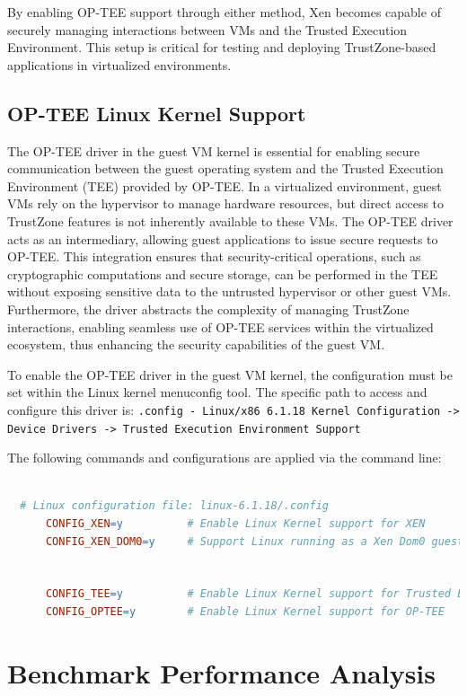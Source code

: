 \documentclass[acmtog]{acmart}
\begin{document}
By enabling OP-TEE support through either method, Xen becomes capable of securely managing interactions between VMs and the Trusted Execution Environment. This setup is critical for testing and deploying TrustZone-based applications in virtualized environments.


\subsection{OP-TEE Linux Kernel Support}
The OP-TEE driver in the guest VM kernel is essential for enabling secure communication between the guest operating system and the Trusted Execution Environment (TEE) provided by OP-TEE. In a virtualized environment, guest VMs rely on the hypervisor to manage hardware resources, but direct access to TrustZone features is not inherently available to these VMs. The OP-TEE driver acts as an intermediary, allowing guest applications to issue secure requests to OP-TEE. This integration ensures that security-critical operations, such as cryptographic computations and secure storage, can be performed in the TEE without exposing sensitive data to the untrusted hypervisor or other guest VMs. Furthermore, the driver abstracts the complexity of managing TrustZone interactions, enabling seamless use of OP-TEE services within the virtualized ecosystem, thus enhancing the security capabilities of the guest VM.

To enable the OP-TEE driver in the guest VM kernel, the configuration must be set within the Linux kernel menuconfig tool. The specific path to access and configure this driver is:
\texttt{.config - Linux/x86 6.1.18 Kernel Configuration -> Device Drivers -> Trusted Execution Environment Support}

The following commands and configurations are applied via the command line:
\begin{lstlisting}[language=make, caption=Enabling OP-TEE in the Linux Kernel Configuration]
 
  # Linux configuration file: linux-6.1.18/.config
      CONFIG_XEN=y          # Enable Linux Kernel support for XEN
      CONFIG_XEN_DOM0=y     # Support Linux running as a Xen Dom0 guest

      
      CONFIG_TEE=y          # Enable Linux Kernel support for Trusted Execution Environment (TEE) 
      CONFIG_OPTEE=y        # Enable Linux Kernel support for OP-TEE
\end{lstlisting}


\section{Benchmark Performance Analysis}
\end{document}
